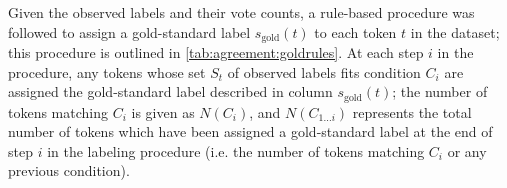 		Given the observed labels and their vote counts, a rule-based procedure was followed to assign a gold-standard label $s_{\text{gold}}(t)$ to each token $t$ in the dataset; this procedure is outlined in \cref{tab:agreement:goldrules}. At each step $i$ in the procedure, any tokens whose set $S_t$ of observed labels fits condition $C_i$ are assigned the gold-standard label described in column $s_{\text{gold}}(t)$; the number of tokens matching $C_i$ is given as $N(C_i)$, and 
		$N(C_{1 \dots i})$ represents the total number of tokens which have been assigned a gold-standard label at the end of step $i$ in the labeling procedure (i.e. the number of tokens matching $C_i$ or any previous condition).
		
		

